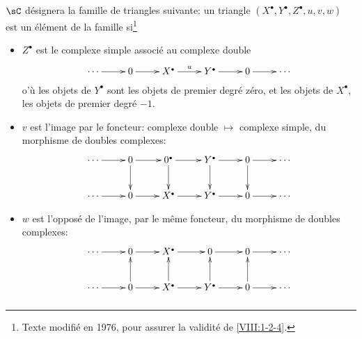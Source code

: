$\sC$ désignera la famille de triangles suivante: un triangle 
$(X^\bullet,Y^\bullet,Z^\bullet,u,v,w)$ est un élément de la famille 
si\footnote{Texte modifié en 1976, pour assurer la validité de 
\ref{VIII:1-2-4}.}
\begin{itemize}
  \item $Z^\bullet$ est le complexe simple associé au complexe double 
    \[\xymatrix{
      \cdots \ar[r] 
        & 0 \ar[r] 
        & X^\bullet \ar[r]^-u 
        & Y^\bullet \ar[r] 
        & 0 \ar[r] 
        & \cdots 
    }\]
    o'ù les objets de $Y^\bullet$ sont les objets de premier degré zéro, 
    et les objets de $X^\bullet$, les objets de premier degré $-1$. 
  \item $v$ est l'image par le foncteur: complexe double $\mapsto$ complexe 
    simple, du morphisme de doubles complexes: 
    \[\xymatrix{
      \cdots \ar[r] 
        & 0 \ar[r] \ar[d] 
        & 0^\bullet \ar[r] \ar[d] 
        & Y^\bullet \ar[r] \ar[d] 
        & 0 \ar[r] \ar[d] 
        & \cdots \\
      \cdots \ar[r] 
        & 0 \ar[r] 
        & X^\bullet \ar[r] 
        & Y^\bullet \ar[r] 
        & 0 \ar[r] 
        & \cdots 
    }\]
  \item $w$ est l'opposé de l'image, par le même foncteur, du morphisme de 
    doubles complexes: 
    \[\xymatrix{
      \cdots \ar[r] 
        & 0 \ar[r] 
        & X^\bullet \ar[r] 
        & 0 \ar[r] 
        & 0 \ar[r] 
        & \cdots \\
      \cdots  \ar[r] 
        & 0 \ar[r] \ar[u] 
        & X^\bullet \ar[r] \ar[u] 
        & Y^\bullet \ar[r] \ar[u] 
        & 0 \ar[r] \ar[u] 
        & \cdots 
    }\]
\end{itemize}





\subsubsection{}\label{VIII:1-2-2}

